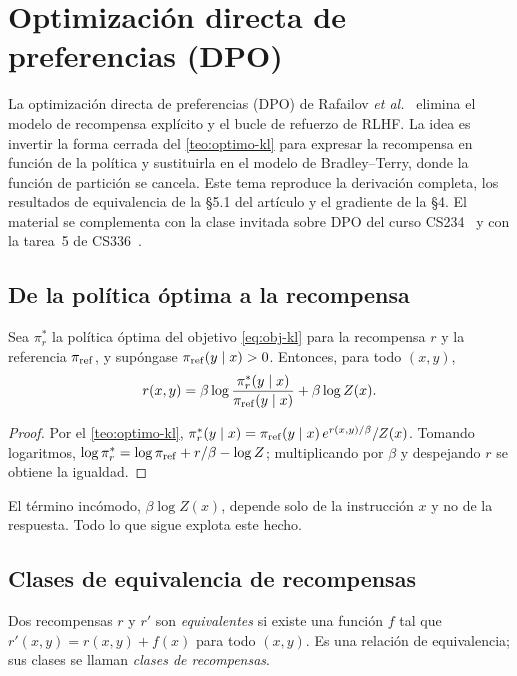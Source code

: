\chapter{Optimización directa de preferencias (DPO)}
\label{tema:5}

La optimización directa de preferencias (DPO) de Rafailov \emph{et al.}~\cite{dpo} elimina el modelo de recompensa explícito y el bucle de refuerzo de RLHF. La idea es invertir la forma cerrada del \cref{teo:optimo-kl} para expresar la recompensa en función de la política y sustituirla en el modelo de Bradley--Terry, donde la función de partición se cancela. Este tema reproduce la derivación completa, los resultados de equivalencia de la §5.1 del artículo y el gradiente de la §4. El material se complementa con la clase invitada sobre DPO del curso CS234~\cite{cs234} y con la tarea~5 de CS336~\cite{cs336a5s}.

\section{De la política óptima a la recompensa}

\begin{lema}[Reparametrización]\label{lem:reparam}
Sea $\pi_r^{*}$ la política óptima del objetivo \eqref{eq:obj-kl} para la recompensa $r$ y la referencia $\pi_{\mathrm{ref}}$, y supóngase $\pi_{\mathrm{ref}}(y\mid x)>0$. Entonces, para todo $(x,y)$,
\[
r(x,y)=\beta\log\frac{\pi_r^{*}(y\mid x)}{\pi_{\mathrm{ref}}(y\mid x)}+\beta\log Z(x).
\]
\end{lema}

\begin{proof}
Por el \cref{teo:optimo-kl}, $\pi_r^{*}(y\mid x)=\pi_{\mathrm{ref}}(y\mid x)\,e^{r(x,y)/\beta}/Z(x)$. Tomando logaritmos, $\log\pi_r^{*}=\log\pi_{\mathrm{ref}}+r/\beta-\log Z$; multiplicando por $\beta$ y despejando $r$ se obtiene la igualdad.
\end{proof}

El término incómodo, $\beta\log Z(x)$, depende solo de la instrucción $x$ y no de la respuesta. Todo lo que sigue explota este hecho.

\section{Clases de equivalencia de recompensas}

\begin{definicion}\label{def:equiv}
Dos recompensas $r$ y $r'$ son \emph{equivalentes} si existe una función $f$ tal que $r'(x,y)=r(x,y)+f(x)$ para todo $(x,y)$. Es una relación de equivalencia; sus clases se llaman \emph{clases de recompensas}.
\end{definicion}

